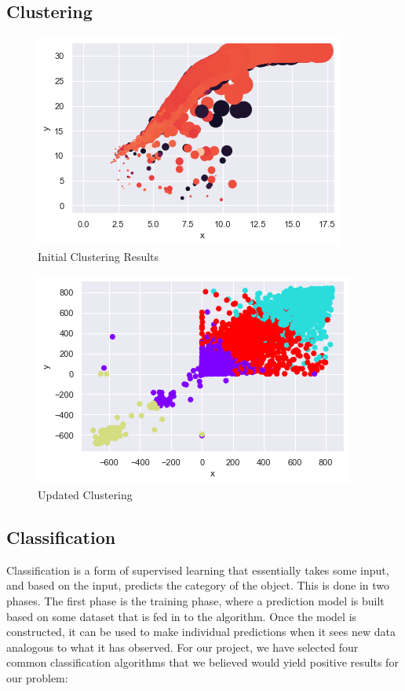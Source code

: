 \documentclass[letterpaper, 10 pt, conference]{ieeeconf}  %
\begin{document}
\subsection{Clustering}



\begin{figure}[htb]
    \centering
    \includegraphics[scale=0.60]{cluster.png}
    \caption{Initial Clustering Results}
    \label{fig:init_cluster}
\end{figure}

\begin{figure}[htb]
    \centering
    \includegraphics[scale=0.60]{cluster_update.png}
    \caption{Updated Clustering}
    \label{fig:updated_cluster}
\end{figure}


\subsection{Classification}
Classification is a form of supervised learning that essentially takes some input, and based on the input, predicts the category of the object. This is done in two phases. The first phase is the training phase, where a prediction model is built based on some dataset that is fed in to the algorithm. Once the model is constructed, it can be used to make individual predictions when it sees new data analogous to what it has observed. 
For our project, we have selected four common classification algorithms that we believed would yield positive results for our problem:
\end{document}
